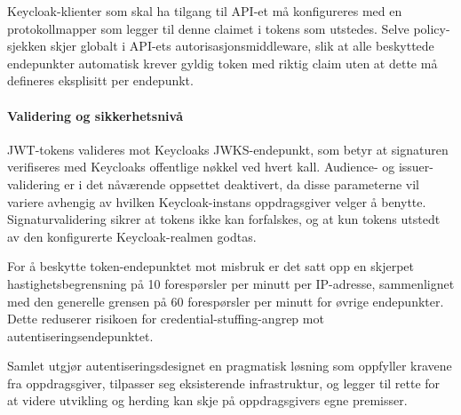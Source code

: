 Keycloak-klienter som skal ha tilgang til API-et må konfigureres med en protokollmapper som legger til denne claimet i tokens som utstedes. Selve policy-sjekken skjer globalt i API-ets autorisasjonsmiddleware, slik at alle beskyttede endepunkter automatisk krever gyldig token med riktig claim uten at dette må defineres eksplisitt per endepunkt.

\paragraph{Validering og sikkerhetsnivå}

JWT-tokens valideres mot Keycloaks JWKS-endepunkt, som betyr at signaturen verifiseres med Keycloaks offentlige nøkkel ved hvert kall. Audience- og issuer-validering er i det nåværende oppsettet deaktivert, da disse parameterne vil variere avhengig av hvilken Keycloak-instans oppdragsgiver velger å benytte. Signaturvalidering sikrer at tokens ikke kan forfalskes, og at kun tokens utstedt av den konfigurerte Keycloak-realmen godtas.

For å beskytte token-endepunktet mot misbruk er det satt opp en skjerpet hastighetsbegrensning på 10 forespørsler per minutt per IP-adresse, sammenlignet med den generelle grensen på 60 forespørsler per minutt for øvrige endepunkter. Dette reduserer risikoen for credential-stuffing-angrep mot autentiseringsendepunktet.

Samlet utgjør autentiseringsdesignet en pragmatisk løsning som oppfyller kravene fra oppdragsgiver, tilpasser seg eksisterende infrastruktur, og legger til rette for at videre utvikling og herding kan skje på oppdragsgivers egne premisser.